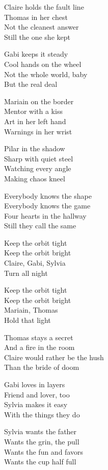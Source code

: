 \begin{lyrics}

Claire holds the fault line\\
Thomas in her chest\\
Not the cleanest answer\\
Still the one she kept

Gabi keeps it steady\\
Cool hands on the wheel\\
Not the whole world, baby\\
But the real deal

Mariain on the border\\
Mentor with a kiss\\
Art in her left hand\\
Warnings in her wrist

Pilar in the shadow\\
Sharp with quiet steel\\
Watching every angle\\
Making chaos kneel

Everybody knows the shape\\
Everybody knows the game\\
Four hearts in the hallway\\
Still they call the same

Keep the orbit tight\\
Keep the orbit bright\\
Claire, Gabi, Sylvia\\
Turn all night

Keep the orbit tight\\
Keep the orbit bright\\
Mariain, Thomas\\
Hold that light

Thomas stays a secret\\
And a fire in the room\\
Claire would rather be the hush\\
Than the bride of doom

Gabi loves in layers\\
Friend and lover, too\\
Sylvia makes it easy\\
With the things they do

Sylvia wants the father\\
Wants the grin, the pull\\
Wants the fun and favors\\
Wants the cup half full


\end{lyrics}
